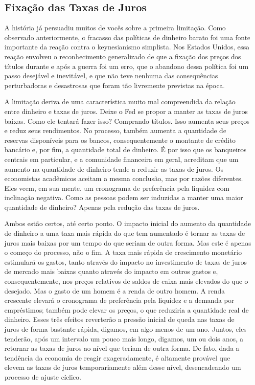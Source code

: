 \documentclass[12pt]{article}
\begin{document}
\subsection*{Fixação das Taxas de Juros}

A história já persuadiu muitos de vocês sobre a primeira limitação. Como observado anteriormente, o fracasso das políticas de dinheiro barato foi uma fonte importante da reação contra o keynesianismo simplista. Nos Estados Unidos, essa reação envolveu o reconhecimento generalizado de que a fixação dos preços dos títulos durante e após a guerra foi um erro, que o abandono dessa política foi um passo desejável e inevitável, e que não teve nenhuma das consequências perturbadoras e desastrosas que foram tão livremente previstas na época.

A limitação deriva de uma característica muito mal compreendida da relação entre dinheiro e taxas de juros. Deixe o Fed se propor a manter as taxas de juros baixas. Como ele tentará fazer isso? Comprando títulos. Isso aumenta seus preços e reduz seus rendimentos. No processo, também aumenta a quantidade de reservas disponíveis para os bancos, consequentemente o montante de crédito bancário e, por fim, a quantidade total de dinheiro. É por isso que os banqueiros centrais em particular, e a comunidade financeira em geral, acreditam que um aumento na quantidade de dinheiro tende a reduzir as taxas de juros. Os economistas acadêmicos aceitam a mesma conclusão, mas por razões diferentes. Eles veem, em sua mente, um cronograma de preferência pela liquidez com inclinação negativa. Como as pessoas podem ser induzidas a manter uma maior quantidade de dinheiro? Apenas pela redução das taxas de juros.

Ambos estão certos, até certo ponto. O impacto inicial do aumento da quantidade de dinheiro a uma taxa mais rápida do que tem aumentado é tornar as taxas de juros mais baixas por um tempo do que seriam de outra forma. Mas este é apenas o começo do processo, não o fim. A taxa mais rápida de crescimento monetário estimulará os gastos, tanto através do impacto no investimento de taxas de juros de mercado mais baixas quanto através do impacto em outros gastos e, consequentemente, nos preços relativos de saldos de caixa mais elevados do que o desejado. Mas o gasto de um homem é a renda de outro homem. A renda crescente elevará o cronograma de preferência pela liquidez e a demanda por empréstimos; também pode elevar os preços, o que reduziria a quantidade real de dinheiro. Esses três efeitos reverterão a pressão inicial de queda nas taxas de juros de forma bastante rápida, digamos, em algo menos de um ano. Juntos, eles tenderão, após um intervalo um pouco mais longo, digamos, um ou dois anos, a retornar as taxas de juros ao nível que teriam de outra forma. De fato, dada a tendência da economia de reagir exageradamente, é altamente provável que elevem as taxas de juros temporariamente além desse nível, desencadeando um processo de ajuste cíclico.
\end{document}
